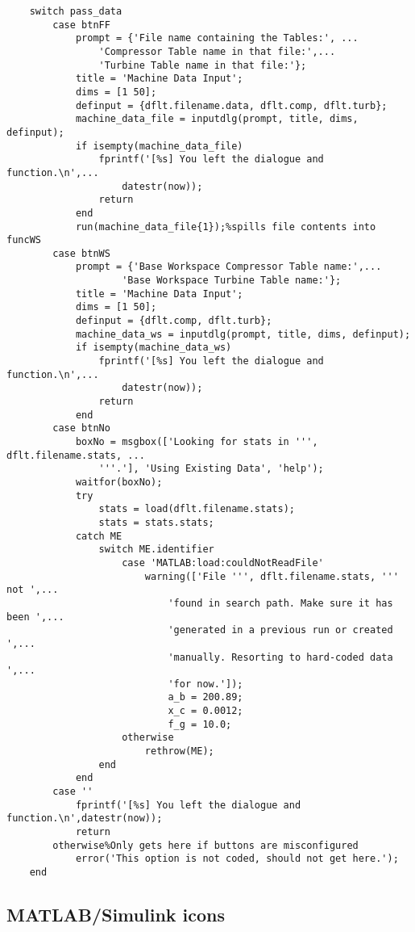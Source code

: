 \begin{verbatim}
    switch pass_data
        case btnFF
            prompt = {'File name containing the Tables:', ...
                'Compressor Table name in that file:',...
                'Turbine Table name in that file:'};
            title = 'Machine Data Input';
            dims = [1 50];
            definput = {dflt.filename.data, dflt.comp, dflt.turb};
            machine_data_file = inputdlg(prompt, title, dims, definput);
            if isempty(machine_data_file)
                fprintf('[%s] You left the dialogue and function.\n',...
                    datestr(now));
                return
            end
            run(machine_data_file{1});%spills file contents into funcWS
        case btnWS
            prompt = {'Base Workspace Compressor Table name:',...
                    'Base Workspace Turbine Table name:'};
            title = 'Machine Data Input';
            dims = [1 50];
            definput = {dflt.comp, dflt.turb};
            machine_data_ws = inputdlg(prompt, title, dims, definput);
            if isempty(machine_data_ws)
                fprintf('[%s] You left the dialogue and function.\n',...
                    datestr(now));
                return
            end
        case btnNo
            boxNo = msgbox(['Looking for stats in ''', dflt.filename.stats, ...
                '''.'], 'Using Existing Data', 'help');
            waitfor(boxNo);
            try
                stats = load(dflt.filename.stats);
                stats = stats.stats;
            catch ME
                switch ME.identifier
                    case 'MATLAB:load:couldNotReadFile'
                        warning(['File ''', dflt.filename.stats, ''' not ',...
                            'found in search path. Make sure it has been ',...
                            'generated in a previous run or created ',...
                            'manually. Resorting to hard-coded data ',...
                            'for now.']);
                            a_b = 200.89;
                            x_c = 0.0012;
                            f_g = 10.0;
                    otherwise
                        rethrow(ME);
                end
            end
        case ''
            fprintf('[%s] You left the dialogue and function.\n',datestr(now));
            return
        otherwise%Only gets here if buttons are misconfigured
            error('This option is not coded, should not get here.');
    end
\end{verbatim}

\subsection{MATLAB/Simulink icons}

